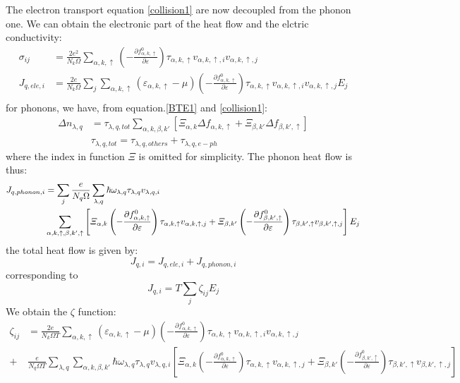 \documentclass{article}
\newcommand{\pfrac}[2]{\frac{\partial #1}{\partial #2}}
\newcommand{\fak}{f_{\alpha,k,\uparrow}}
\newcommand{\fbk}{f_{\beta,k',\uparrow}}
\newcommand{\ak}{\alpha,k,\uparrow}
\newcommand{\bk}{\beta,k',\uparrow}
\newcommand{\ql}{\lambda,q}
\begin{document}
The electron transport equation \ref{collision1} are now decoupled from the phonon one. 
We can obtain the electronic part of the heat flow and the elctric conductivity:
\begin{align}
    \sigma_{ij} &= \frac{2e^2}{N_k \Omega} \sum_{\ak} \left(-\pfrac{\fak^0}{\varepsilon}\right) \tau_{\ak} v_{\ak,i}v_{\ak,j} \\
    J_{q,ele,i} &= \frac{2e}{N_k \Omega} \sum_j \sum_{\ak} (\varepsilon_{\ak}-\mu)  \left(-\pfrac{\fak^0}{\varepsilon}\right) \tau_{\ak} v_{\ak,i}v_{\ak,j} E_j \\
\end{align}
for phonons, we have, from equation.\ref{BTE1} and \ref{collision1}:
\begin{align}
    \Delta n_{\ql} &= \tau_{\ql,tot}\sum_{\alpha,k,\beta,k'} \left[ \varXi_{\alpha,k}\Delta \fak + \varXi_{\beta,k'}\Delta\fbk \right]  \\
    &\tau_{\ql,tot} = \tau_{\ql,others}+\tau_{\ql,e-ph}
\end{align}
where the index in function $\varXi$ is omitted for simplicity. The phonon heat flow is thus:
\begin{align}
    J_{q,phonon,i} &= \sum_j \frac{e}{N_q\Omega} \sum_{\ql} \hbar \omega_{\ql} \tau_{\ql} v_{\ql,i} \notag \\ 
     & \sum_{\ak,\bk} \left[ \varXi_{\alpha,k} \left(-\pfrac{\fak^0}{\varepsilon}\right) \tau_{\ak} v_{\ak,j} + \varXi_{\beta,k'}  \left(-\pfrac{\fbk^0}{\varepsilon}\right) \tau_{\bk} v_{\bk,j} \right] E_j
\end{align} 
the total heat flow is given by:
\begin{equation}
    J_{q,i} = J_{q,ele,i} + J_{q,phonon,i}
\end{equation}
corresponding to 
\begin{equation}
    J_{q,i} = T \sum_j \zeta_{ij} E_j
\end{equation}
We obtain the $\zeta$ function:
\begin{align}
    \zeta_{ij} & = \frac{2e}{N_k \Omega T} \sum_{\ak} (\varepsilon_{\ak}-\mu)  \left(-\pfrac{\fak^0}{\varepsilon}\right) \tau_{\ak} v_{\ak,i}v_{\ak,j} \\
      +& \frac{e}{N_q \Omega T} \sum_{\ql} \sum_{\alpha,k,\beta,k'} \hbar \omega_{\ql} \tau_{\ql} v_{\ql,i}\left[ \varXi_{\alpha,k} \left(-\pfrac{\fak^0}{\varepsilon}\right) \tau_{\ak} v_{\ak,j} + \varXi_{\beta,k'}  \left(-\pfrac{\fbk^0}{\varepsilon}\right) \tau_{\bk} v_{\bk,j} \right]
\end{align}
\end{document}
